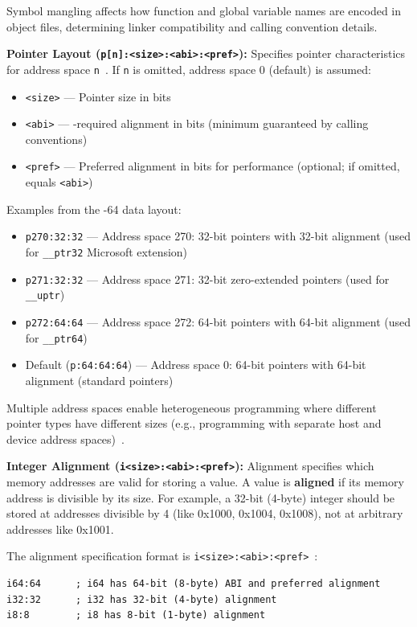Symbol mangling affects how function and global variable names are encoded in object files, determining linker compatibility and calling convention details.

\textbf{Pointer Layout (\texttt{p[n]:<size>:<abi>:<pref>}):} Specifies pointer characteristics for address space \texttt{n}~\cite{llvmlangref}. If \texttt{n} is omitted, address space 0 (default) is assumed:
\begin{itemize}[noitemsep]
  \item \texttt{<size>} --- Pointer size in bits
  \item \texttt{<abi>} --- -required alignment in bits (minimum guaranteed by calling conventions)
  \item \texttt{<pref>} --- Preferred alignment in bits for performance (optional; if omitted, equals \texttt{<abi>})
\end{itemize}

Examples from the -64 data layout:
\begin{itemize}[noitemsep]
  \item \texttt{p270:32:32} --- Address space 270: 32-bit pointers with 32-bit alignment (used for \texttt{\_\_ptr32} Microsoft extension)
  \item \texttt{p271:32:32} --- Address space 271: 32-bit zero-extended pointers (used for \texttt{\_\_uptr})
  \item \texttt{p272:64:64} --- Address space 272: 64-bit pointers with 64-bit alignment (used for \texttt{\_\_ptr64})
  \item Default (\texttt{p:64:64:64}) --- Address space 0: 64-bit pointers with 64-bit alignment (standard pointers)
\end{itemize}

Multiple address spaces enable heterogeneous programming where different pointer types have different sizes (e.g.,  programming with separate host and device address spaces)~\cite{lopesauler2014}.

\textbf{Integer Alignment (\texttt{i<size>:<abi>:<pref>}):} Alignment specifies which memory addresses are valid for storing a value. A value is \textbf{aligned} if its memory address is divisible by its size. For example, a 32-bit (4-byte) integer should be stored at addresses divisible by 4 (like 0x1000, 0x1004, 0x1008), not at arbitrary addresses like 0x1001.

The alignment specification format is \texttt{i<size>:<abi>:<pref>}~\cite{llvmlangref}:

\begin{lstlisting}[style=ir]
i64:64      ; i64 has 64-bit (8-byte) ABI and preferred alignment
i32:32      ; i32 has 32-bit (4-byte) alignment
i8:8        ; i8 has 8-bit (1-byte) alignment
\end{lstlisting}

